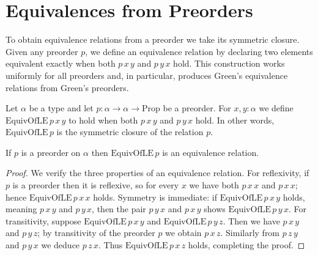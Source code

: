 \section{Equivalences from Preorders}

To obtain equivalence relations from a preorder we take its symmetric closure.  Given any preorder \(p\), we define an equivalence relation by declaring two elements equivalent exactly when both \(p\,x\,y\) and \(p\,y\,x\) hold.  This construction works uniformly for all preorders and, in particular, produces Green's equivalence relations from Green's preorders.

\begin{definition}
\label{def:EquivOfLE}
Let \(\alpha\) be a type and let \(p : \alpha \to \alpha \to \mathrm{Prop}\) be a preorder.  For \(x,y : \alpha\) we define
\(\mathrm{EquivOfLE}\,p\,x\,y\) to hold when both \(p\,x\,y\) and \(p\,y\,x\) hold.  In other words, \(\mathrm{EquivOfLE}\,p\) is the symmetric closure of the relation \(p\).
\leanok
\end{definition}

\begin{lemma}
\label{lem:EquivOfLE-isEquivalence}
If \(p\) is a preorder on \(\alpha\) then \(\mathrm{EquivOfLE}\,p\) is an equivalence relation.
\leanok
{}
\end{lemma}
\begin{proof}
\leanok
We verify the three properties of an equivalence relation.  For reflexivity, if \(p\) is a preorder then it is reflexive, so for every \(x\) we have both \(p\,x\,x\) and \(p\,x\,x\); hence \(\mathrm{EquivOfLE}\,p\,x\,x\) holds.  Symmetry is immediate: if \(\mathrm{EquivOfLE}\,p\,x\,y\) holds, meaning \(p\,x\,y\) and \(p\,y\,x\), then the pair \(p\,y\,x\) and \(p\,x\,y\) shows \(\mathrm{EquivOfLE}\,p\,y\,x\).  For transitivity, suppose \(\mathrm{EquivOfLE}\,p\,x\,y\) and \(\mathrm{EquivOfLE}\,p\,y\,z\).  Then we have \(p\,x\,y\) and \(p\,y\,z\); by transitivity of the preorder \(p\) we obtain \(p\,x\,z\).  Similarly from \(p\,z\,y\) and \(p\,y\,x\) we deduce \(p\,z\,x\).  Thus \(\mathrm{EquivOfLE}\,p\,x\,z\) holds, completing the proof.
\end{proof}
